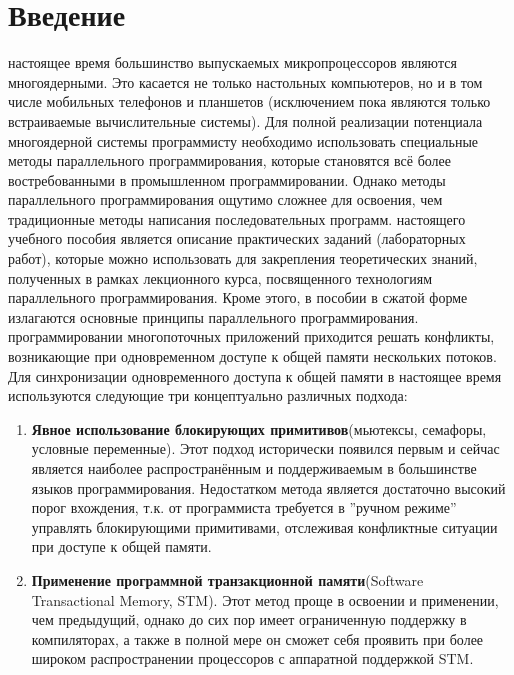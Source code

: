 { %
	\section*{Введение}
	 настоящее время большинство выпускаемых микропроцессоров являются многоядерными. Это касается не только настольных компьютеров, но и в том числе мобильных телефонов и планшетов (исключением пока являются только встраиваемые вычислительные системы). Для полной реализации потенциала многоядерной системы программисту необходимо использовать специальные методы параллельного программирования, которые становятся всё более востребованными в промышленном программировании. Однако методы параллельного программирования ощутимо сложнее для освоения, чем традиционные методы написания последовательных программ.
	 настоящего учебного пособия является описание практических заданий (лабораторных работ), которые можно использовать для закрепления теоретических знаний, полученных в рамках лекционного курса, посвященного технологиям параллельного программирования. Кроме этого, в пособии в сжатой форме излагаются основные принципы параллельного программирования.%
	 программировании многопоточных приложений приходится решать конфликты, возникающие при одновременном доступе к общей памяти нескольких потоков. Для синхронизации одновременного доступа к общей памяти в настоящее время используются следующие три концептуально различных подхода:
	\begin{enumerate}
		\item\textbf{Явное использование блокирующих примитивов}\quad(мьютексы, семафоры, условные переменные). Этот подход исторически появился первым и сейчас является наиболее распространённым и поддерживаемым в большинстве языков программирования. Недостатком метода является достаточно высокий порог вхождения, т.к. от программиста требуется в ''ручном режиме'' управлять блокирующими примитивами, отслеживая конфликтные ситуации при доступе к общей памяти.
		\item\textbf{Применение программной транзакционной памяти}\quad(Software\\ Transactional Memory, STM). Этот метод проще в освоении и применении, чем предыдущий, однако до сих пор имеет ограниченную поддержку в компиляторах, а также в полной мере он сможет себя проявить при более широком распространении процессоров с аппаратной поддержкой STM.

\end{enumerate}}
